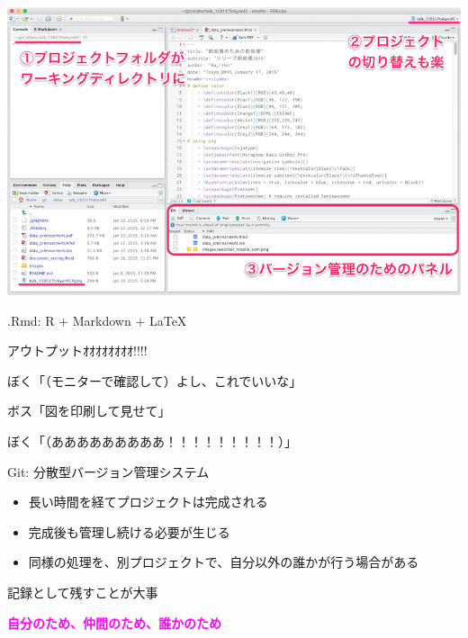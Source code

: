 \documentclass[ignorenonframetext,]{beamer}
\begin{document}
\begin{frame}

\includegraphics[scale = 0.8]{images/rstudio_panel.png}

\end{frame}

\begin{frame}{.Rmd: R + Markdown + \LaTeX}


\end{frame}

\begin{frame}{アウトプットｵｵｵｵｵｵｵｵ!!!!}

ぼく「（モニターで確認して）よし、これでいいな」

ボス「図を印刷して見せて」

ぼく「（あああああああああ！！！！！！！！！）」


\end{frame}

\begin{frame}{Git: 分散型バージョン管理システム}

\begin{itemize}
\itemsep1pt\parskip0pt
\item
  長い時間を経てプロジェクトは完成される
\item
  完成後も管理し続ける必要が生じる
\item
  同様の処理を、別プロジェクトで、自分以外の誰かが行う場合がある
\end{itemize}

\faHandLeft 記録として残すことが大事

\textbf{\textcolor{magenta}{\faUser 自分のため、\faGroup 仲間のため、\faGlobe 誰かのため}}

\end{frame}
\end{document}
